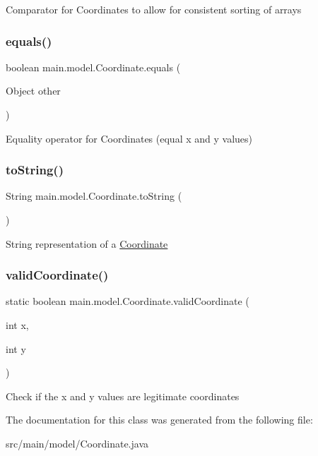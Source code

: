 Comparator for Coordinates to allow for consistent sorting of arrays \hypertarget{classmain_1_1model_1_1_coordinate_a1e984b946ab806ab6921358700dc4619}{}\label{classmain_1_1model_1_1_coordinate_a1e984b946ab806ab6921358700dc4619} 
\subsubsection{\texorpdfstring{equals()}{equals()}}
{\footnotesize\ttfamily boolean main.\+model.\+Coordinate.\+equals (\begin{DoxyParamCaption}\item[{Object}]{other }\end{DoxyParamCaption})}

Equality operator for Coordinates (equal x and y values) \hypertarget{classmain_1_1model_1_1_coordinate_abf2f4212b8c3dd47c5cbc735935733f3}{}\label{classmain_1_1model_1_1_coordinate_abf2f4212b8c3dd47c5cbc735935733f3} 
\subsubsection{\texorpdfstring{to\+String()}{toString()}}
{\footnotesize\ttfamily String main.\+model.\+Coordinate.\+to\+String (\begin{DoxyParamCaption}{ }\end{DoxyParamCaption})}

String representation of a \hyperlink{classmain_1_1model_1_1_coordinate}{Coordinate} \hypertarget{classmain_1_1model_1_1_coordinate_a438e61b11e63eb9522f754e84ecbee40}{}\label{classmain_1_1model_1_1_coordinate_a438e61b11e63eb9522f754e84ecbee40} 
\subsubsection{\texorpdfstring{valid\+Coordinate()}{validCoordinate()}}
{\footnotesize\ttfamily static boolean main.\+model.\+Coordinate.\+valid\+Coordinate (\begin{DoxyParamCaption}\item[{int}]{x,  }\item[{int}]{y }\end{DoxyParamCaption})\hspace{0.3cm}{\ttfamily [static]}}

Check if the x and y values are legitimate coordinates 

The documentation for this class was generated from the following file\+:\begin{DoxyCompactItemize}
\item 
src/main/model/Coordinate.\+java\end{DoxyCompactItemize}
